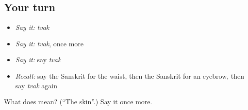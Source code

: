 \subsection*{Your turn}
\begin{itemize}
\raggedright
  \item \emph{Say it:} \emph{tvak}
  \item \emph{Say it:} \emph{tvak}, once more
  \item \emph{Say it:} say \emph{tvak}
  \item \emph{Recall:} say the Sanskrit for the waist, then the Sanskrit for an eyebrow, then say \emph{tvak} again
\end{itemize}

\begin{tcolorbox}[breakable,colback=teal!4,colframe=teal!35!black,title={Before you move on}]
What does  mean? (\textquotedblleft{}The skin\textquotedblright{}.) Say it once more.
\end{tcolorbox}
